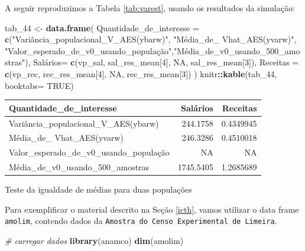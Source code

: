 \documentclass[]{book}
\newenvironment{Shaded}{\begin{snugshade}}{\end{snugshade}}
\newcommand{\KeywordTok}[1]{\textcolor[rgb]{0.13,0.29,0.53}{\textbf{#1}}}
\newcommand{\DataTypeTok}[1]{\textcolor[rgb]{0.13,0.29,0.53}{#1}}
\newcommand{\DecValTok}[1]{\textcolor[rgb]{0.00,0.00,0.81}{#1}}
\newcommand{\StringTok}[1]{\textcolor[rgb]{0.31,0.60,0.02}{#1}}
\newcommand{\CommentTok}[1]{\textcolor[rgb]{0.56,0.35,0.01}{\textit{#1}}}
\newcommand{\OtherTok}[1]{\textcolor[rgb]{0.56,0.35,0.01}{#1}}
\newcommand{\OperatorTok}[1]{\textcolor[rgb]{0.81,0.36,0.00}{\textbf{#1}}}
\newcommand{\NormalTok}[1]{#1}
\theoremstyle{definition}
\theoremstyle{definition}
\theoremstyle{definition}
\theoremstyle{remark}
\let\BeginKnitrBlock\begin \let\EndKnitrBlock\end
\begin{document}
A seguir reproduzimos a Tabela \ref{tab:varest}, usando os resultados da
simulação:

\begin{Shaded}
\begin{Highlighting}[]
\NormalTok{tab_}\DecValTok{44}\NormalTok{ <-}\StringTok{ }\KeywordTok{data.frame}\NormalTok{(}
\DataTypeTok{Quantidade_de_interesse =} \KeywordTok{c}\NormalTok{(}\StringTok{"Variância_populacional_V_AES(ybarw)"}\NormalTok{, }\StringTok{"Média_de_ Vhat_AES(yvarw)"}\NormalTok{,}
\StringTok{"Valor_esperado_de_v0_usando_população"}\NormalTok{,}\StringTok{"Média_de_v0_usando_500_amostras"}\NormalTok{),}
\NormalTok{Salá}\DataTypeTok{rios=} \KeywordTok{c}\NormalTok{(vp_sal, sal_res_mean[}\DecValTok{4}\NormalTok{], }\OtherTok{NA}\NormalTok{, sal_res_mean[}\DecValTok{3}\NormalTok{]),}
\DataTypeTok{Receitas =} \KeywordTok{c}\NormalTok{(vp_rec, rec_res_mean[}\DecValTok{4}\NormalTok{], }\OtherTok{NA}\NormalTok{, rec_res_mean[}\DecValTok{3}\NormalTok{])  }
\NormalTok{ )}
\NormalTok{knitr}\OperatorTok{::}\KeywordTok{kable}\NormalTok{(tab_}\DecValTok{44}\NormalTok{, }\DataTypeTok{booktabs=} \OtherTok{TRUE}\NormalTok{)}
\end{Highlighting}
\end{Shaded}

\begin{tabular}{lrr}
\toprule
Quantidade\_de\_interesse & Salários & Receitas\\
\midrule
Variância\_populacional\_V\_AES(ybarw) & 244.1758 & 0.4349945\\
Média\_de\_ Vhat\_AES(yvarw) & 246.3286 & 0.4510018\\
Valor\_esperado\_de\_v0\_usando\_população & NA & NA\\
Média\_de\_v0\_usando\_500\_amostras & 1745.5405 & 1.2685689\\
\bottomrule
\end{tabular}

\BeginKnitrBlock{example}
\protect\hypertarget{exm:eqmean}{}{\label{exm:eqmean} }Teste da igualdade de
médias para duas populações
\EndKnitrBlock{example}

Para exemplificar o material descrito na Seção \ref{icth}, vamos
utilizar o data frame \texttt{amolim}, contendo dados da
\texttt{Amostra\ do\ Censo\ Experimental\ de\ Limeira}.

\begin{Shaded}
\begin{Highlighting}[]
\CommentTok{# carregar dados}
\KeywordTok{library}\NormalTok{(anamco)}
\KeywordTok{dim}\NormalTok{(amolim)}
\end{Highlighting}
\end{Shaded}
\end{document}
